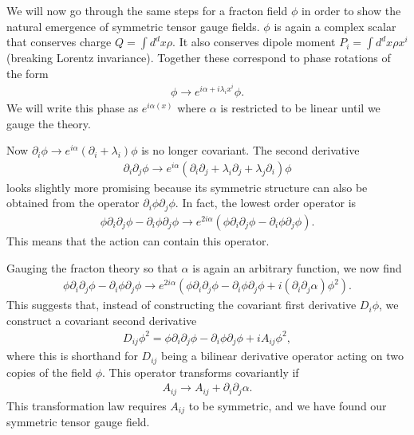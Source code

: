 \documentclass[a4paper,11pt]{article}
\begin{document}
We will now go through the same steps for a fracton field $\phi$ in order to show the natural emergence of symmetric tensor gauge fields. $\phi$ is again a complex scalar that conserves charge $Q=\int d^dx\rho$. It also conserves dipole moment $P_i = \int d^dx\rho x^i$ (breaking Lorentz invariance). Together these correspond to phase rotations of the form 
\begin{align}
\phi\to e^{i\alpha+i\lambda_ix^i}\phi.
\end{align}
We will write this phase as $e^{i\alpha(x)}$ where $\alpha$ is restricted to be linear until we gauge the theory.

Now $\partial_i\phi\to e^{i\alpha}(\partial_i+\lambda_i)\phi$ is no longer covariant. The second derivative 
\begin{align}
\partial_i\partial_j\phi\to e^{i\alpha}(\partial_i\partial_j+\lambda_i\partial_j+\lambda_j\partial_i)\phi
\end{align}
looks slightly more promising because its symmetric structure can also be obtained from the operator $\partial_i\phi\partial_j\phi$. In fact, the lowest order operator is~\cite{PretkoFractonGauge}
\begin{align}
\phi\partial_i\partial_j\phi-\partial_i\phi\partial_j\phi \to e^{2i\alpha} \left(\phi\partial_i\partial_j\phi-\partial_i\phi\partial_j\phi\right).
\end{align}
This means that the action can contain this operator.

Gauging the fracton theory so that $\alpha$ is again an arbitrary function, we now find
\begin{align}
\phi\partial_i\partial_j\phi-\partial_i\phi\partial_j\phi \to e^{2i\alpha} \left(\phi\partial_i\partial_j\phi-\partial_i\phi\partial_j\phi + i(\partial_i\partial_j\alpha)\phi^2\right).
\end{align}
This suggests that, instead of constructing the covariant first derivative $D_i\phi$, we construct a covariant second derivative 
\begin{align}
D_{ij}\phi^2=\phi\partial_i\partial_j\phi-\partial_i\phi\partial_j\phi + iA_{ij}\phi^2,
\end{align}
where this is shorthand for $D_{ij}$ being a bilinear derivative operator acting on two copies of the field $\phi$. This operator transforms covariantly if 
\begin{align}
A_{ij}\to A_{ij}+\partial_i\partial_j\alpha.
\end{align}
This transformation law requires $A_{ij}$ to be symmetric, and we have found our symmetric tensor gauge field. 
\end{document}
